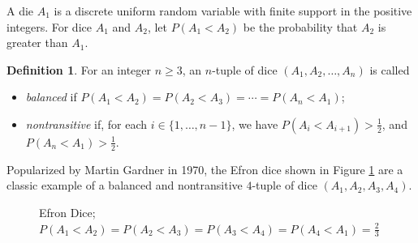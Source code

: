 \documentclass[11pt]{article}
\theoremstyle{definition}
\newtheorem{defn}[theorem]{Definition}
\begin{document}
A die $A_1$ is a discrete uniform random variable with finite support in the positive integers. For dice $A_1$ and $A_2$, let $P(A_1<A_2)$ be the probability that $A_2$ is greater than $A_1$.
\begin{defn}
    For an integer $n \geq 3$, an $n$-tuple of dice $(A_1,A_2,\dots, A_n)$ is called
    \begin{itemize}
        \item \emph{balanced} if $P(A_1 < A_2) = P(A_2 < A_3) = \cdots = P(A_n < A_1)$;
        \item \emph{nontransitive} if, for each $i \in \{ 1,\dots,n-1\}$, we have $P(A_i < A_{i+1}) > \frac{1}{2}$, and $P(A_n < A_1) > \frac{1}{2}$.
    \end{itemize}
\end{defn}
Popularized by Martin Gardner \cite{Gardner} in 1970, the Efron dice shown in Figure \ref{EfronDice} are a classic example of a balanced and nontransitive $4$-tuple of dice $(A_1,A_2,A_3,A_4)$.
\begin{figure}[ht]
\centering
{}

\caption{Efron Dice; $P(A_1 < A_2) = P(A_2 < A_3) = P(A_3 < A_4) = P(A_4 < A_1) = \frac{2}{3}$} \label{EfronDice}
\end{figure}
\end{document}
